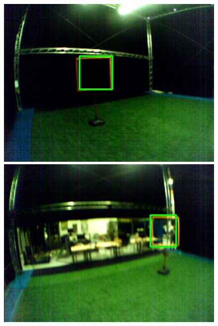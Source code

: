 \begin{figure}[hbtp]
\centering
\begin{minipage}{0.24\textwidth}
	\includegraphics[width=\textwidth]{fig/examples/cyberzoo_nice1.jpg}
\end{minipage}
\begin{minipage}{0.24\textwidth}
	\includegraphics[width=\textwidth]{fig/examples/cyberzoo_nice2.jpg}
\end{minipage}
\begin{minipage}{0.24\textwidth}

\end{minipage}
\end{figure}
